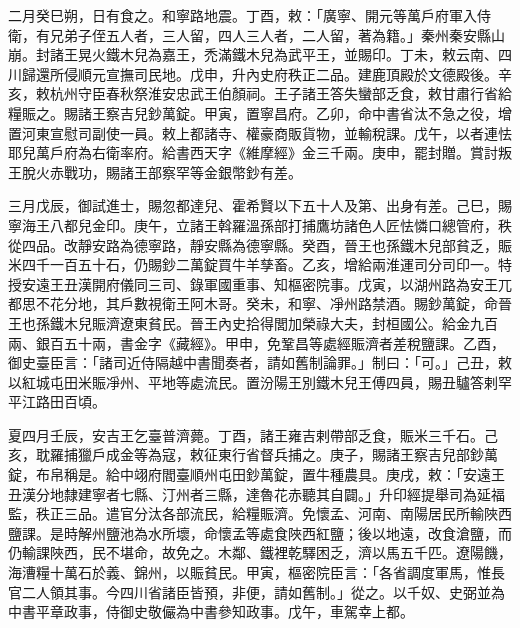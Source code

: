 \begin{pinyinscope}
 二月癸巳朔，日有食之。和寧路地震。丁酉，敕：「廣寧、開元等萬戶府軍入侍衛，有兄弟子侄五人者，三人留，四人三人者，二人留，著為籍。」秦州秦安縣山崩。封諸王晃火鐵木兒為嘉王，禿滿鐵木兒為武平王，並賜印。丁未，敕云南、四川歸還所侵順元宣撫司民地。戊申，升內史府秩正二品。建鹿頂殿於文德殿後。辛亥，敕杭州守臣春秋祭淮安忠武王伯顏祠。王子諸王答失蠻部乏食，敕甘肅行省給糧賑之。賜諸王察吉兒鈔萬錠。甲寅，置寧昌府。乙卯，命中書省汰不急之役，增置河東宣慰司副使一員。敕上都諸寺、權豪商販貨物，並輸稅課。戊午，以者連怯耶兒萬戶府為右衛率府。給書西天字《維摩經》金三千兩。庚申，罷封贈。賞討叛王脫火赤戰功，賜諸王部察罕等金銀幣鈔有差。



 三月戊辰，御試進士，賜忽都達兒、霍希賢以下五十人及第、出身有差。己巳，賜寧海王八都兒金印。庚午，立諸王斡羅溫孫部打捕鷹坊諸色人匠怯憐口總管府，秩從四品。改靜安路為德寧路，靜安縣為德寧縣。癸酉，晉王也孫鐵木兒部貧乏，賑米四千一百五十石，仍賜鈔二萬錠買牛羊孳畜。乙亥，增給兩淮運司分司印一。特授安遠王丑漢開府儀同三司、錄軍國重事、知樞密院事。戊寅，以湖州路為安王兀都思不花分地，其戶數視衛王阿木哥。癸未，和寧、凈州路禁酒。賜鈔萬錠，命晉王也孫鐵木兒賑濟遼東貧民。晉王內史拾得閭加榮祿大夫，封桓國公。給金九百兩、銀百五十兩，書金字《藏經》。甲申，免鞏昌等處經賑濟者差稅鹽課。乙酉，御史臺臣言：「諸司近侍隔越中書聞奏者，請如舊制論罪。」制曰：「可。」己丑，敕以紅城屯田米賑凈州、平地等處流民。置汾陽王別鐵木兒王傅四員，賜丑驢答剌罕平江路田百頃。



 夏四月壬辰，安吉王乞臺普濟薨。丁酉，諸王雍吉剌帶部乏食，賑米三千石。己亥，耽羅捕獵戶成金等為寇，敕征東行省督兵捕之。庚子，賜諸王察吉兒部鈔萬錠，布帛稱是。給中翊府閻臺順州屯田鈔萬錠，置牛種農具。庚戌，敕：「安遠王丑漢分地隸建寧者七縣、汀州者三縣，達魯花赤聽其自闢。」升印經提舉司為延福監，秩正三品。遣官分汰各部流民，給糧賑濟。免懷孟、河南、南陽居民所輸陜西鹽課。是時解州鹽池為水所壞，命懷孟等處食陜西紅鹽；後以地遠，改食滄鹽，而仍輸課陜西，民不堪命，故免之。木鄰、鐵裡乾驛困乏，濟以馬五千匹。遼陽饑，海漕糧十萬石於義、錦州，以賑貧民。甲寅，樞密院臣言：「各省調度軍馬，惟長官二人領其事。今四川省諸臣皆預，非便，請如舊制。」從之。以千奴、史弼並為中書平章政事，侍御史敬儼為中書參知政事。戊午，車駕幸上都。




\end{pinyinscope}

